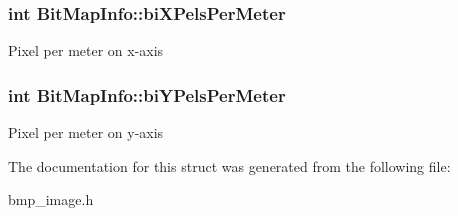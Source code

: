 \subsubsection[{\texorpdfstring{bi\+X\+Pels\+Per\+Meter}{biXPelsPerMeter}}]{\setlength{\rightskip}{0pt plus 5cm}int Bit\+Map\+Info\+::bi\+X\+Pels\+Per\+Meter}\hypertarget{structBitMapInfo_ae9c2afcdcf52ddf9f5fdb843576a4581}{}\label{structBitMapInfo_ae9c2afcdcf52ddf9f5fdb843576a4581}
Pixel per meter on x-\/axis 
\subsubsection[{\texorpdfstring{bi\+Y\+Pels\+Per\+Meter}{biYPelsPerMeter}}]{\setlength{\rightskip}{0pt plus 5cm}int Bit\+Map\+Info\+::bi\+Y\+Pels\+Per\+Meter}\hypertarget{structBitMapInfo_a669501761a51dc29cdee4367a7c24aed}{}\label{structBitMapInfo_a669501761a51dc29cdee4367a7c24aed}
Pixel per meter on y-\/axis 

The documentation for this struct was generated from the following file\+:\begin{DoxyCompactItemize}
\item 
bmp\+\_\+image.\+h\end{DoxyCompactItemize}
